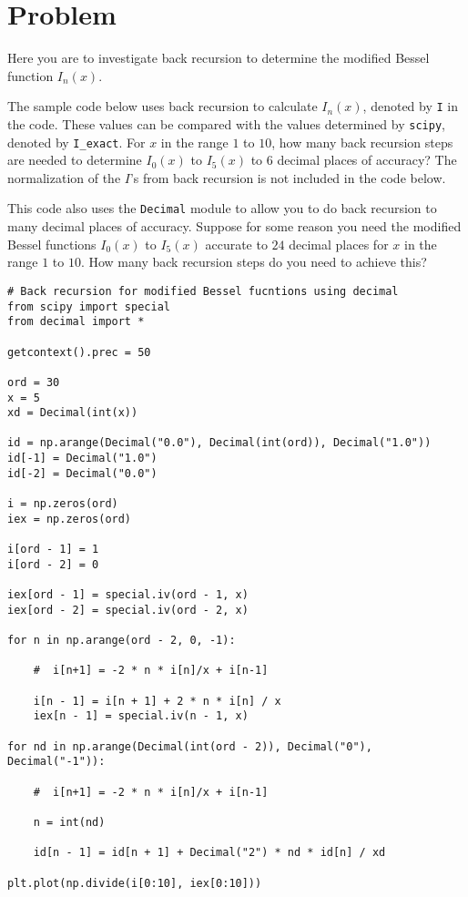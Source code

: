 \section{Problem \thesection}

Here you are to investigate back recursion to determine the modified Bessel function
$I_n(x)$.

The sample code below uses back recursion to calculate $I_n(x)$, denoted by \texttt{I} in
the code. These values can be compared with the values determined by \texttt{scipy}, denoted by
\texttt{I\_exact}. For $x$ in the range $1$ to $10$, how many back recursion steps are needed to
determine $I_0(x)$ to $I_5(x)$ to $6$ decimal places of accuracy? The normalization of the
$I$'s from back recursion is not included in the code below.

This code also uses the \texttt{Decimal} module to allow you to do back recursion to many
decimal places of accuracy. Suppose for some reason you need the modified Bessel functions
$I_0(x)$ to $I_5(x)$ accurate to $24$ decimal places for $x$ in the range $1$ to $10$. How
many back recursion steps do you need to achieve this?

\begin{verbatim}
# Back recursion for modified Bessel fucntions using decimal
from scipy import special
from decimal import *

getcontext().prec = 50

ord = 30
x = 5
xd = Decimal(int(x))

id = np.arange(Decimal("0.0"), Decimal(int(ord)), Decimal("1.0"))
id[-1] = Decimal("1.0")
id[-2] = Decimal("0.0")

i = np.zeros(ord)
iex = np.zeros(ord)

i[ord - 1] = 1
i[ord - 2] = 0

iex[ord - 1] = special.iv(ord - 1, x)
iex[ord - 2] = special.iv(ord - 2, x)

for n in np.arange(ord - 2, 0, -1):

    #  i[n+1] = -2 * n * i[n]/x + i[n-1]

    i[n - 1] = i[n + 1] + 2 * n * i[n] / x
    iex[n - 1] = special.iv(n - 1, x)

for nd in np.arange(Decimal(int(ord - 2)), Decimal("0"), Decimal("-1")):

    #  i[n+1] = -2 * n * i[n]/x + i[n-1]

    n = int(nd)

    id[n - 1] = id[n + 1] + Decimal("2") * nd * id[n] / xd

plt.plot(np.divide(i[0:10], iex[0:10]))
\end{verbatim}
